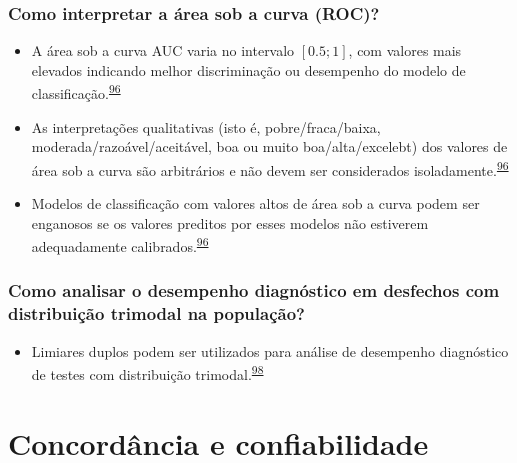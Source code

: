 \documentclass[
]{book}
\providecommand{\tightlist}{%
  \setlength{\itemsep}{0pt}\setlength{\parskip}{0pt}}
\begin{document}
\hypertarget{como-interpretar-a-uxe1rea-sob-a-curva-roc}{%
\subsection{Como interpretar a área sob a curva (ROC)?}\label{como-interpretar-a-uxe1rea-sob-a-curva-roc}}

\begin{itemize}
\item
  A área sob a curva AUC varia no intervalo \([0.5; 1]\), com valores mais elevados indicando melhor discriminação ou desempenho do modelo de classificação.\textsuperscript{\protect\hyperlink{ref-de2022}{96}}
\item
  As interpretações qualitativas (isto é, pobre/fraca/baixa, moderada/razoável/aceitável, boa ou muito boa/alta/excelebt) dos valores de área sob a curva são arbitrários e não devem ser considerados isoladamente.\textsuperscript{\protect\hyperlink{ref-de2022}{96}}
\item
  Modelos de classificação com valores altos de área sob a curva podem ser enganosos se os valores preditos por esses modelos não estiverem adequadamente calibrados.\textsuperscript{\protect\hyperlink{ref-de2022}{96}}
\end{itemize}

\hypertarget{como-analisar-o-desempenho-diagnuxf3stico-em-desfechos-com-distribuiuxe7uxe3o-trimodal-na-populauxe7uxe3o}{%
\subsection{Como analisar o desempenho diagnóstico em desfechos com distribuição trimodal na população?}\label{como-analisar-o-desempenho-diagnuxf3stico-em-desfechos-com-distribuiuxe7uxe3o-trimodal-na-populauxe7uxe3o}}

\begin{itemize}
\tightlist
\item
  Limiares duplos podem ser utilizados para análise de desempenho diagnóstico de testes com distribuição trimodal.\textsuperscript{\protect\hyperlink{ref-ferreira2021}{98}}
\end{itemize}

\hypertarget{analise-concordancia-confiabilidade}{%
\chapter{\texorpdfstring{\textbf{Concordância e confiabilidade}}{Concordância e confiabilidade}}\label{analise-concordancia-confiabilidade}}
\end{document}

